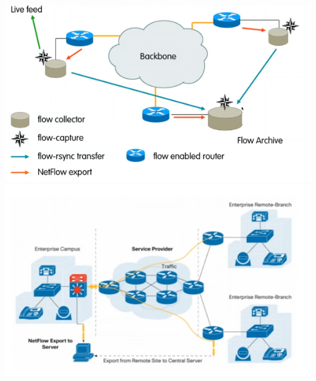 \documentclass[10pt]{book}
\begin{document}
\begin{center}
	\includegraphics[scale=0.75]{netflowarch.png}\\
	\includegraphics[scale=0.75]{netflowarch2.png}
\end{center}
\end{document}
